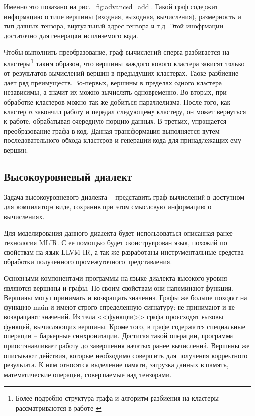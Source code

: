 Именно это показано на рис.~\ref{fig:advanced_add}. Такой граф содержит
информацию о типе вершины (входная, выходная, вычисления), размерность и тип
данных тензора, виртуальный адрес тензора и т.д. Этой инофрмации достаточно
для генерации исплняемого кода.

Чтобы выполнить преобразование, граф вычислений сперва разбивается на 
кластеры\footnote{Более подробно структура графа и алгоритм разбиения на кластеры
рассматриваются в работе \cite{graph}} таким образом, что вершины каждого нового кластера
зависят только от результатов вычислений вершин в предыдущих кластерах. Таоке
разбиение дает ряд преимуществ. Во-первых, вершины в пределах одного кластера
независимы, а значит их можно вычислять одновременно. Во-вторых, при обработке
кластеров можно так же добиться параллелизма. После того, как кластер $n$
закончил работу и передал следующему кластеру, он может вернуться к работе,
обрабатывая очередную порцию данных. В-третьих, упрощается преобразование графа
в код. Данная трансформация выполняется путем последовательного обхода кластеров
и генерации кода для принадлежащих ему вершин.

\subsection{Высокоуровневый диалект}
Задача высокоуровневого диалекта -- представить граф вычислений в доступном для
компилятора виде, сохранив при этом смысловую информацию о вычислениях.

Для моделирования данного диалекта будет использоваться описанная ранее
технология MLIR. С ее помощью будет сконструирован язык, похожий по свойствам
на язык LLVM IR, а так же разработаны инструментальные средства обработки
полученного промежуточного представления.

Основными компонентами программы на языке диалекта высокого уровня являются
вершины и графы. По своим свойствам они напоминают функции. Вершины могут 
принимать и возвращать значения. Графы же больше походят на функцию main и 
имеют строго определенную сигнатуру: не принимают и не возвращают значений.
Из тела <<функции>> графа происходят вызовы функций, вычисляющих вершины.
Кроме того, в графе содержатся специальные операции -- барьерные синхронизации.
Достигая такой операции, программа приостанавливает работу до завершения
начатых ранее вычислений. Вершины же описывают действия, которые необходимо
совершить для получения корректного результата. К ним относятся выделение памяти,
загрузка данных в память, математические операции, совершаемые над тензорами.


